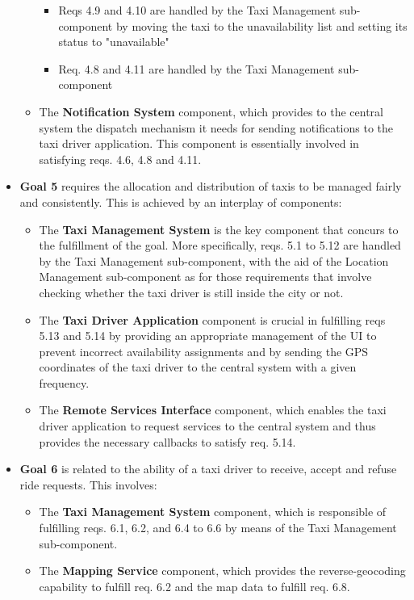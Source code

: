 \begin{itemize}
\begin{itemize}
\begin{itemize}
	\item Reqs 4.9 and 4.10 are handled by the Taxi Management sub-component by moving the taxi to the unavailability list and setting its status to "unavailable"
	\item Req. 4.8 and 4.11 are handled by the Taxi Management sub-component
	\end{itemize}
	\item The \textbf{Notification System} component, which provides to the central system the dispatch mechanism it needs for sending notifications to the taxi driver application. This component is essentially involved in satisfying reqs. 4.6, 4.8 and 4.11.
	\end{itemize}
	\item \textbf{Goal 5} requires the allocation and distribution of taxis to be managed fairly and consistently. This is achieved by an interplay of components: 
	\begin{itemize}
	\item The \textbf{Taxi Management System} is the key component that concurs to the fulfillment of the goal. More specifically, reqs. 5.1 to 5.12 are handled by the Taxi Management sub-component, with the aid of the Location Management sub-component as for those requirements that involve checking whether the taxi driver is still inside the city or not. 
	\item The \textbf{Taxi Driver Application} component is crucial in fulfilling reqs 5.13 and 5.14 by providing an appropriate management of the UI to prevent incorrect availability assignments and by sending the GPS coordinates of the taxi driver to the central system with a given frequency.
	\item The \textbf{Remote Services Interface} component, which enables the taxi driver application to request services to the central system and thus provides the necessary callbacks to satisfy req. 5.14. 	
	\end{itemize}
	\item \textbf{Goal 6} is related to the ability of a taxi driver to receive, accept and refuse ride requests. This involves:
	\begin{itemize}
	\item The \textbf{Taxi Management System} component, which is responsible of fulfilling reqs. 6.1, 6.2, and 6.4 to 6.6 by means of the Taxi Management sub-component.
	\item The \textbf{Mapping Service} component, which provides the reverse-geocoding capability to fulfill req. 6.2 and the map data to fulfill req. 6.8.

\end{itemize}
\end{itemize}

